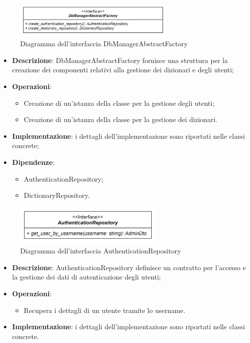  \label{DbManagerAbstractFactory}
\begin{figure}[H]
    \centering
    \includegraphics[width=0.7\textwidth]{assets/Backend/db_manager_abstract_factory.png}
    \caption{Diagramma dell'interfaccia DbManagerAbstractFactory}
  \end{figure}
\begin{itemize}
    \item \textbf{Descrizione}: DbManagerAbstractFactory fornisce una struttura per la creazione dei componenti relativi alla gestione dei dizionari e degli utenti;
    \item \textbf{Operazioni}:
    \begin{itemize}
      \item Creazione di un'istanza della classe per la gestione degli utenti;
      \item Creazione di un'istanza della classe per la gestione dei dizionari.
    \end{itemize}
    \item \textbf{Implementazione}: i dettagli dell'implementazione sono riportati nelle classi concrete;
    \item \textbf{Dipendenze}:
    \begin{itemize}
      \item AuthenticationRepository;
      \item DictionaryRepository.
    \end{itemize}
\end{itemize} 

 \label{AuthenticationRepository}
\begin{figure}[H]
    \centering
    \includegraphics[width=0.65\textwidth]{assets/Backend/authentication_repository.png}
    \caption{Diagramma dell'interfaccia AuthenticationRepository}
  \end{figure}
\begin{itemize}
    \item \textbf{Descrizione}: AuthenticationRepository definisce un contratto per l'accesso e la gestione dei dati di autenticazione degli utenti;
    \item \textbf{Operazioni}: 
    \begin{itemize}
      \item Recupera i dettagli di un utente tramite lo username.
    \end{itemize}
    \item \textbf{Implementazione}: i dettagli dell'implementazione sono riportati nelle classi concrete.
\end{itemize}

